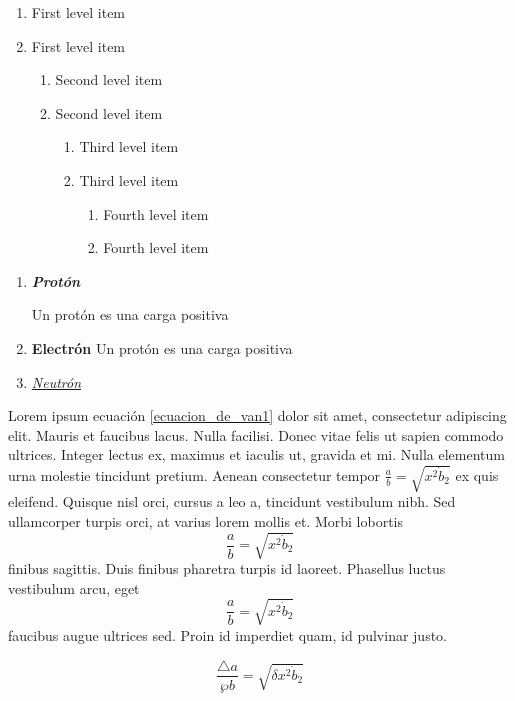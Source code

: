 \begin{enumerate}
   \item First level item
   \item First level item
   \begin{enumerate}
     \item Second level item
     \item Second level item
     \begin{enumerate}
       \item Third level item
       \item Third level item
       \begin{enumerate}
         \item Fourth level item
         \item Fourth level item
       \end{enumerate}
     \end{enumerate}
   \end{enumerate}
 \end{enumerate}
 
\begin{enumerate}[1)]
\item \textit{\textbf{Protón}}

Un protón es una carga positiva
\item \textbf{Electrón} Un protón es una carga positiva
\item \underline{\textit{Neutrón}}
\end{enumerate}

Lorem ipsum ecuación \ref{ecuacion_de_van1} dolor sit amet, consectetur adipiscing elit. Mauris et faucibus lacus. Nulla facilisi. Donec vitae felis ut sapien commodo ultrices. Integer lectus ex, maximus et iaculis ut, gravida et mi. Nulla elementum urna molestie tincidunt pretium. Aenean consectetur tempor $\frac{a}{b} = \sqrt{x^2 \dot b_2}$ ex quis eleifend. Quisque nisl orci, cursus a leo a, tincidunt vestibulum nibh. Sed ullamcorper turpis orci, at varius lorem mollis et. Morbi lobortis $$ \frac{a}{b} = \sqrt{x^2 \dot b_2} $$ finibus sagittis. Duis finibus pharetra turpis id laoreet. Phasellus luctus vestibulum arcu, eget\[ \frac{a}{b} = \sqrt{x^2 \dot b_2}\] faucibus augue ultrices sed. Proin id imperdiet quam, id pulvinar justo.



\begin{equation}
    \label{eq:ecuacion_de_van1}
    \frac{\triangle a}{\wp b} = \sqrt{\delta x^2 \dot b_2} 
\end{equation}

